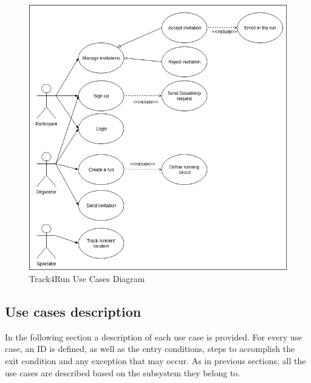 \documentclass[12pt]{report}
\begin{document}
\begin{itemize}
\begin{figure}[H]
\centering
	\includegraphics[scale=0.5]{Diagrams/t4r_use_cases.png}
\caption[Track4Run Use Cases Diagram]{Track4Run Use Cases Diagram}
\label{fig:t4r_use_cases}
\end{figure}
\end{itemize}

\subsection{Use cases description}
In the following section a description of each use case is provided. For every use case, an ID is defined, as well as the entry conditions, steps to accomplish the exit condition and any exception that may occur. As in previous sections, all the use cases are described based on the subsystem they belong to.
\end{document}
